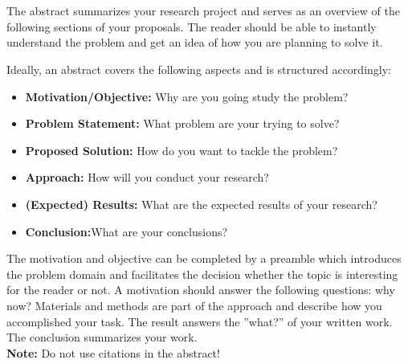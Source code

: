 \chapter{\abstractname}

The abstract summarizes your research project and serves as an overview of the following sections of your proposals.
The reader should be able to instantly understand the problem and get an idea of how you are planning to solve it.

Ideally, an abstract covers the following aspects and is structured accordingly:

\begin{itemize}
	\item \textbf{Motivation/Objective:} Why are you going study the problem? 
	\item \textbf{Problem Statement:} What problem are your trying to solve? 
	\item \textbf{Proposed Solution:} How do you want to tackle the problem? 
	\item \textbf{Approach:} How will you conduct your research?
	\item \textbf{(Expected) Results:} What are the expected results of your research? 
	\item \textbf{Conclusion:}What are your conclusions? 
\end{itemize}

The motivation and objective can be completed by a preamble which introduces the problem domain and facilitates the decision whether the topic is interesting for the reader or not.
A motivation should answer the following questions: why now?
Materials and methods are part of the approach and describe how you accomplished your task.
The result answers the ''what?'' of your written work.
The conclusion summarizes your work.\\

\noindent \textbf{Note:} Do not use citations in the abstract! \\ 



